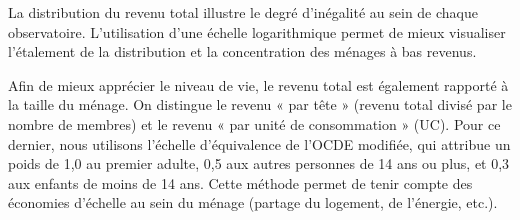 \documentclass[
  french,
  letterpaper,
]{report}
\begin{document}
La distribution du revenu total illustre le degré d'inégalité au sein de
chaque observatoire. L'utilisation d'une échelle logarithmique permet de
mieux visualiser l'étalement de la distribution et la concentration des
ménages à bas revenus.

Afin de mieux apprécier le niveau de vie, le revenu total est également
rapporté à la taille du ménage. On distingue le revenu « par tête »
(revenu total divisé par le nombre de membres) et le revenu « par unité
de consommation » (UC). Pour ce dernier, nous utilisons l'échelle
d'équivalence de l'OCDE modifiée, qui attribue un poids de 1,0 au
premier adulte, 0,5 aux autres personnes de 14 ans ou plus, et 0,3 aux
enfants de moins de 14 ans. Cette méthode permet de tenir compte des
économies d'échelle au sein du ménage (partage du logement, de
l'énergie, etc.).
\end{document}
